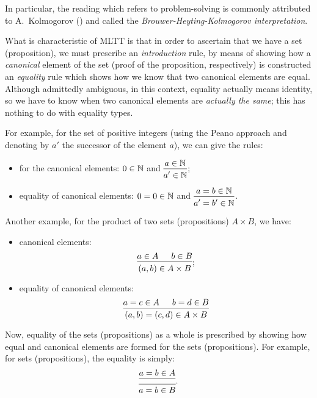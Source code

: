 In particular, the reading which refers to problem-solving is commonly attributed to
A.\ Kolmogorov (\cite{kolm}) and called the \emph{Brouwer-Heyting-Kolmogorov interpretation}.

What is characteristic of MLTT is that in order to ascertain that we have a set
(proposition), we must prescribe an \emph{introduction} rule, by means of showing
how a \emph{canonical} element of the set (proof of the proposition, respectively)
is constructed an \emph{equality} rule which shows how we know that two canonical
elements are equal. Although admittedly ambiguous, in this context, equality
actually means identity, so we have to know when two canonical elements are
\emph{actually the same}; this has nothing to do with equality types.

For example, for the set of positive integers (using the Peano approach and denoting
by $ a' $ the successor of the element $ a $), we can give the rules:
\begin{itemize}
\item for the canonical elements: $ 0 \in \mathbb{N} $ and %
  $ \begin{prooftree} \hypo{a \in \NN} \infer1{a' \in \NN} \end{prooftree} $;
\item equality of canonical elements: $ 0 = 0 \in \mathbb{N} $ and
  $ \begin{prooftree} \hypo{a = b \in \NN} \infer1{a' = b' \in \NN} \end{prooftree} $.
\end{itemize}

Another example, for the product of two sets (propositions) $ A \times B $, we have:
\begin{itemize}
\item canonical elements:
  \[
    \begin{prooftree}
      \hypo{a \in A} \hypo{b \in B} \infer2{(a, b) \in A \times B}
    \end{prooftree};
  \]
\item equality of canonical elements:
  \[
    \begin{prooftree}
      \hypo{a = c \in A} \hypo{b = d \in B}
      \infer2{(a, b) = (c, d) \in A \times B}
    \end{prooftree}
  \]
\end{itemize}

Now, equality of the sets (propositions) as a whole is prescribed by showing
how equal and canonical elements are formed for the sets (propositions).
For example, for sets (propositions), the equality is simply:
\[
  \begin{prooftree}
    \hypo{a = b \in A}
    \infer1{}
    \infer1{a = b \in B}
  \end{prooftree}.
\]

